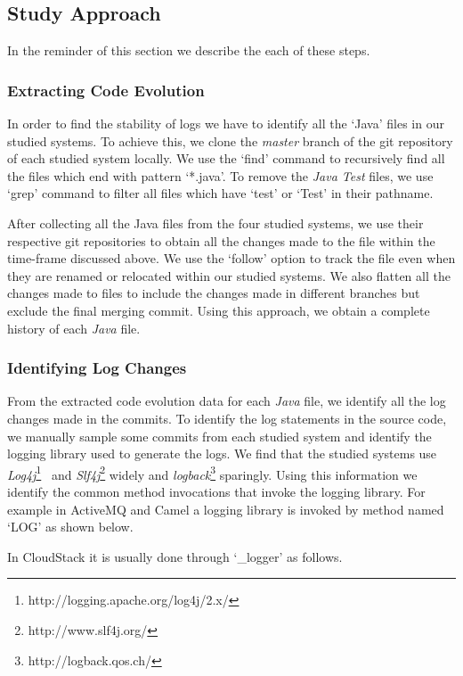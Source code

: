 \subsection{Study Approach}

 In the reminder of this section we describe the each of these steps.

\subsubsection{Extracting Code Evolution}
In order to find the stability of logs we have to identify all the `Java' files in our studied systems. To achieve this, we clone the \emph{master} branch of the git repository of each studied system locally. We use the `find' command to recursively find all the files which end with pattern `*.java'. To remove the \textsl{Java Test} files, we use `grep' command to filter all files which have `test' or `Test' in their pathname.

 After collecting all the Java files from the four studied systems, we use their respective git repositories to obtain all the changes made to the file within the time-frame discussed above. We use the `follow' option to track the file even when they are renamed or relocated within our studied systems. We also flatten all the changes made to files to include the changes made in different branches but exclude the final merging commit. Using this approach, we obtain a complete history of each \emph{Java} file. 

\subsubsection{Identifying Log Changes}
From the extracted code evolution data for each \emph{Java} file, we identify all the log changes made in the commits. To identify the log statements in the source code, we manually sample some commits from each studied system and identify the logging library used to generate the logs. We find that the studied systems use \textsl{Log4j}\footnote{http://logging.apache.org/log4j/2.x/}~\cite{EMSEIAN} and \textsl{Slf4j}\footnote{http://www.slf4j.org/} widely and \textsl{logback}\footnote{http://logback.qos.ch/} sparingly. Using this information we identify the common method invocations that invoke the logging library. For example in  ActiveMQ and Camel a logging library is invoked by method named `LOG' as shown below.

In CloudStack it is usually done through `\_logger' as follows.

